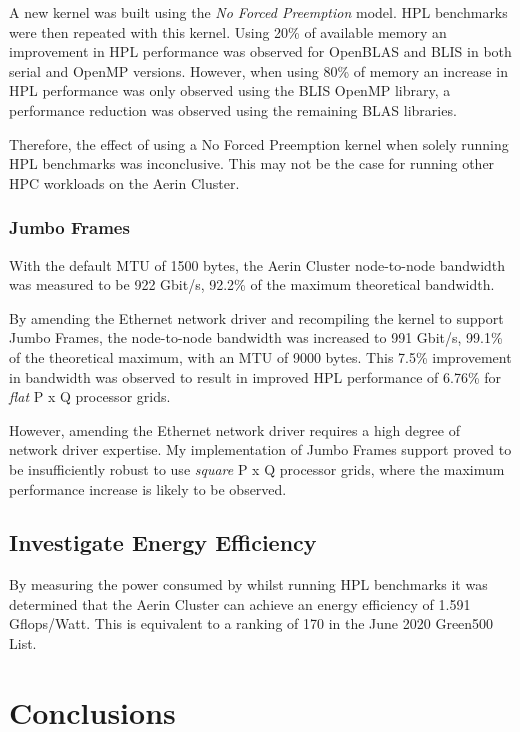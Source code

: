 A new kernel was built using the \emph{No Forced Preemption} model. HPL benchmarks were then repeated with this kernel. Using 20\% of available memory an improvement in HPL performance was observed for OpenBLAS and BLIS in both serial and OpenMP versions. However, when using 80\% of memory an increase in HPL performance was only observed using the BLIS OpenMP library, a performance reduction was observed using the remaining BLAS libraries.

Therefore, the effect of using a No Forced Preemption kernel when solely running HPL benchmarks was inconclusive. This may not be the case for running other HPC workloads on the Aerin Cluster.


\subsubsection{Jumbo Frames}

With the default MTU of 1500 bytes, the Aerin Cluster node-to-node bandwidth was measured to be 922 Gbit/s, 92.2\% of the maximum theoretical bandwidth.

By amending the Ethernet network driver and recompiling the kernel to support Jumbo Frames, the node-to-node bandwidth was increased to 991 Gbit/s, 99.1\% of the theoretical maximum, with an MTU of 9000 bytes. This 7.5\% improvement in bandwidth was observed to result in improved HPL performance of 6.76\% for \emph{flat} P x Q processor grids.

However, amending the Ethernet network driver requires a high degree of network driver expertise. My  implementation of Jumbo Frames support proved to be insufficiently robust to use \emph{square} P x Q processor grids, where the maximum performance increase is likely to be observed.


%
%
\subsection{Investigate Energy Efficiency}

By measuring the power consumed by whilst running HPL benchmarks it was determined that the Aerin Cluster can achieve an energy efficiency of 1.591 Gflops/Watt. This is equivalent to a ranking of 170 in the June 2020 Green500 List.  


%
%
\section{Conclusions}

